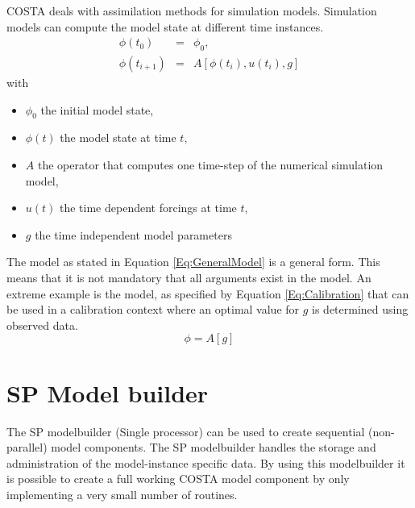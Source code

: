 COSTA deals with assimilation methods for simulation models. Simulation models
can compute the model state at different time instances. 
\begin{eqnarray}\label{Eq:GeneralModel}
\phi \left( t_0 \right) &=& \phi_0, \nonumber \\
\phi\left( t_{i+1} \right) &=& 
 A \left[ \phi \left(t_i\right), u \left( t_i \right), g\right]
\end{eqnarray}
with
\begin{itemize}
\item $\phi_0$ the initial model state,
\item $\phi\left(t\right)$ the model state at time $t$,
\item $A$ the operator that computes one time-step of the numerical
      simulation model,
\item $u\left(t\right)$ the time dependent forcings at
      time $t$,
\item $g$ the time independent model parameters
\end{itemize}

The model as stated in Equation \ref{Eq:GeneralModel} is a general form.
This means that it is not mandatory that all arguments exist in the model.
An extreme example is the model, as specified by Equation
\ref{Eq:Calibration} that can be used in a calibration context where an
optimal value for $g$ is determined using observed data.
\begin{equation}\label{Eq:Calibration}
\phi = A \left[g\right]
\end{equation}

\section{SP Model builder}
The SP modelbuilder (Single processor) can be used to create
sequential (non-parallel) model components. The SP modelbuilder handles the
storage and administration of the model-instance specific data. By using
this modelbuilder it is possible to create a full working COSTA model
component by only implementing a very small number of routines.

